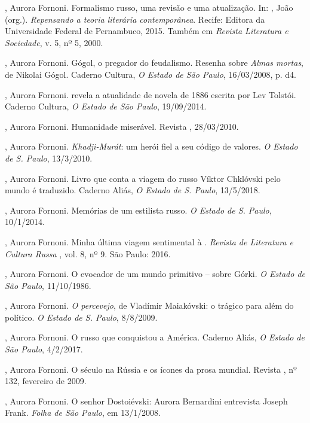 \begin{Parskip}
{, Aurora Fornoni. Formalismo russo, uma revisão e uma
atualização. In: , João (org.). \emph{Repensando a teoria
literária contemporânea}. Recife: Editora da Universidade Federal de
Pernambuco, 2015. Também em \emph{Revista Literatura e Sociedade}, v. 5, nº 5, 2000.

, Aurora Fornoni. Gógol, o pregador do feudalismo. Resenha
sobre \emph{Almas mortas}, de Nikolai Gógol. Caderno Cultura, \emph{O Estado de São Paulo}, 16/03/2008, p. d4.

, Aurora Fornoni.  revela a atualidade de novela de 1886
escrita por Lev Tolstói. Caderno Cultura, \emph{O Estado de São Paulo}, 19/09/2014.

, Aurora Fornoni. Humanidade miserável. Revista , 28/03/2010.

, Aurora Fornoni. \emph{Khadji-Murát}: um herói fiel a seu código de valores. \emph{O Estado de S. Paulo}, 13/3/2010.

, Aurora Fornoni. Livro que conta a viagem do russo Víktor Chklóvski pelo mundo é traduzido. Caderno Aliás, \emph{O Estado de S. Paulo}, 13/5/2018.

, Aurora Fornoni. Memórias de um estilista russo. \emph{O Estado de S. Paulo}, 10/1/2014.

, Aurora Fornoni. Minha última viagem sentimental à .
\emph{Revista de Literatura e Cultura Russa }, vol. 8, nº 9. São Paulo: 2016.

, Aurora Fornoni. O evocador de um mundo primitivo -- sobre
Górki. \emph{O Estado de São Paulo}, 11/10/1986.

, Aurora Fornoni. \emph{O percevejo}, de Vladímir Maiakóvski: o trágico para além do político. \emph{O Estado de S. Paulo}, 8/8/2009.

, Aurora Fornoni. O russo que conquistou a América. Caderno Aliás, \emph{O Estado de São Paulo}, 4/2/2017.

, Aurora Fornoni. O século  na Rússia e os ícones da prosa mundial. Revista , nº 132, fevereiro de 2009.

, Aurora Fornoni. O senhor Dostoiévski: Aurora Bernardini entrevista Joseph Frank. \emph{Folha de São Paulo}, em 13/1/2008.

}
\end{Parskip}
